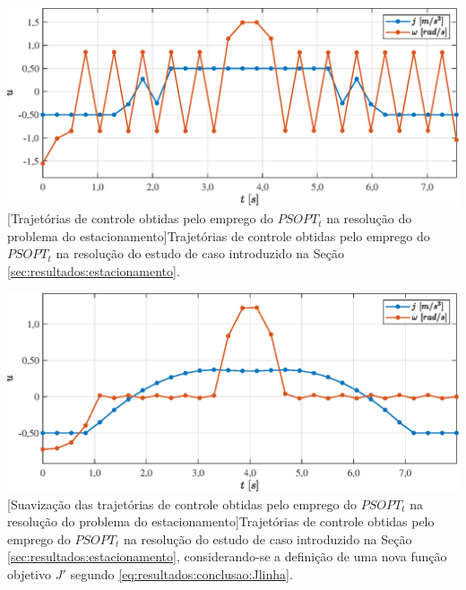 \noindent	
\begin{minipage}{\textwidth}
	\vspace{\onelineskip}
	\centering
	\includegraphics[width=1\linewidth]{fig/resultados/obs/J=u2/estacionamento}
	[Trajetórias de controle obtidas pelo emprego do $ PSOPT_t $ na resolução do problema do estacionamento]{Trajetórias de controle obtidas pelo emprego do $ PSOPT_t $ na resolução do estudo de caso introduzido na Seção \ref{sec:resultados:estacionamento}.}
	\label{fig:resultados:conclusao:estacionamento}
	\vspace{\onelineskip}
\end{minipage}

\noindent	
\begin{minipage}{\textwidth}
	\vspace{\onelineskip}
	\centering
	\includegraphics[width=1\linewidth]{fig/resultados/obs/J=u2/estacionamentoJ=u2}
	[Suavização das trajetórias de controle obtidas pelo emprego do $ PSOPT_t $ na resolução do problema do estacionamento]{Trajetórias de controle obtidas pelo emprego do $ PSOPT_t $ na resolução do estudo de caso introduzido na Seção \ref{sec:resultados:estacionamento}, considerando-se a definição de uma nova função objetivo $ J' $ segundo \eqref{eq:resultados:conclusao:Jlinha}.}
	\label{fig:resultados:conclusao:estacionamentoJ=u2}
	\vspace{\onelineskip}
\end{minipage}

